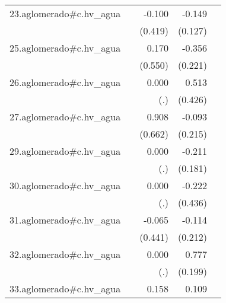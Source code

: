 {\begin{longtable}{l*{4}{D{.}{.}{-1}}}
\addlinespace
23.aglomerado#c.hv\_agua&                     &      -0.100         &      -0.149         &                     \\
            &                     &     (0.419)         &     (0.127)         &                     \\
\addlinespace
25.aglomerado#c.hv\_agua&                     &       0.170         &      -0.356         &                     \\
            &                     &     (0.550)         &     (0.221)         &                     \\
\addlinespace
26.aglomerado#c.hv\_agua&                     &       0.000         &       0.513         &                     \\
            &                     &         (.)         &     (0.426)         &                     \\
\addlinespace
27.aglomerado#c.hv\_agua&                     &       0.908         &      -0.093         &                     \\
            &                     &     (0.662)         &     (0.215)         &                     \\
\addlinespace
29.aglomerado#c.hv\_agua&                     &       0.000         &      -0.211         &                     \\
            &                     &         (.)         &     (0.181)         &                     \\
\addlinespace
30.aglomerado#c.hv\_agua&                     &       0.000         &      -0.222         &                     \\
            &                     &         (.)         &     (0.436)         &                     \\
\addlinespace
31.aglomerado#c.hv\_agua&                     &      -0.065         &      -0.114         &                     \\
            &                     &     (0.441)         &     (0.212)         &                     \\
\addlinespace
32.aglomerado#c.hv\_agua&                     &       0.000         &       0.777\sym{***}&                     \\
            &                     &         (.)         &     (0.199)         &                     \\
\addlinespace
33.aglomerado#c.hv\_agua&                     &       0.158         &       0.109         &                     \\

\end{longtable}}
